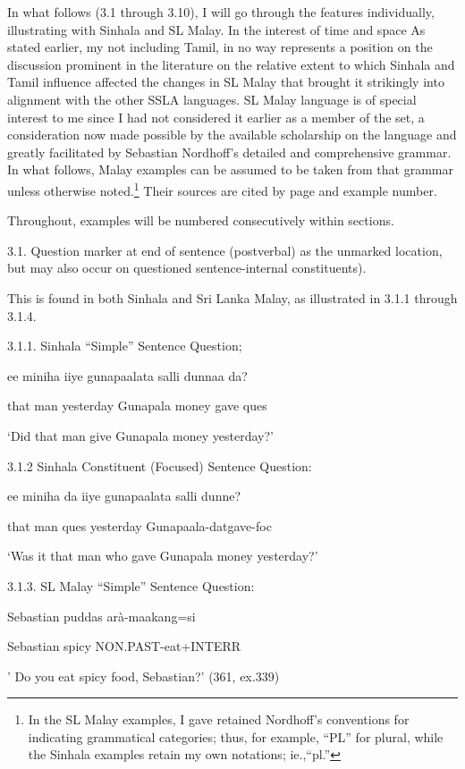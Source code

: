 \documentclass[letterpaper]{article}
\begin{document}
In what follows (3.1 through 3.10), I will go through the features individually, illustrating with Sinhala and SL Malay. In the interest of time and space As stated earlier, my not including Tamil, in no way represents a position on the discussion prominent in the literature on the relative extent to which Sinhala and Tamil influence affected the changes in SL Malay that brought it strikingly into alignment with the other SSLA languages. SL Malay language is of special interest to me since I had not considered it earlier as a member of the set, a consideration now made possible by the available scholarship on the language and greatly facilitated by Sebastian Nordhoff's detailed and comprehensive grammar. In what follows, Malay examples can be assumed to be taken from that grammar unless otherwise noted.\footnote{In
  the SL Malay examples, I gave retained Nordhoff's conventions for indicating grammatical categories; thus, for example,  ``PL'' for plural, while the Sinhala examples retain my own notations; ie.,``pl.''
} 
Their sources are cited by page and example number.

Throughout, examples will be numbered consecutively within sections. 

3.1. Question marker at end of sentence (postverbal) as the unmarked location, but may also occur on questioned sentence-internal constituents).

This is found in both Sinhala and Sri Lanka Malay, as illustrated in 3.1.1 through 3.1.4. 

 3.1.1. Sinhala ``Simple'' Sentence Question;

\ea
\gll ee miniha  iiye  gunapaalat{\dag}a salli  dunnaa  da?

  that  man  yesterday Gunapala money gave ques

  `Did that man give Gunapala money yesterday?'

 3.1.2 Sinhala Constituent (Focused) Sentence Question:


\ea
\gll  ee miniha da  iiye  gunapaalat{\dag}a  salli dunne?  

 that man ques  yesterday Gunapaala-datgave-foc  

 `Was it that man who gave Gunapala money yesterday?'

 3.1.3.  SL Malay ``Simple'' Sentence Question:


\ea
\gll   Sebastian puddas arà-maakang=si

  Sebastian spicy NON.PAST-eat+INTERR

'  Do you eat spicy food, Sebastian?' (361, ex.339)
\end{document}
